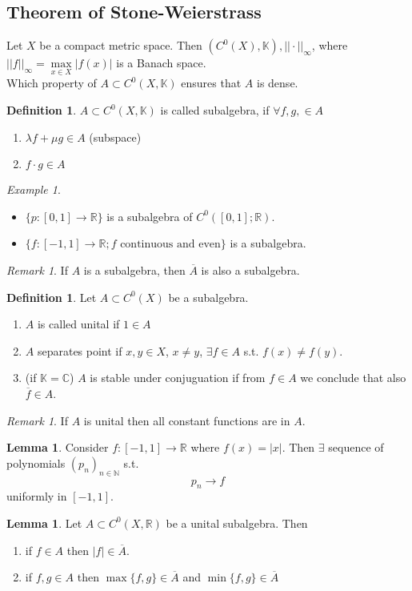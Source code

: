 \documentclass[a4paper, 12pt]{article}
\theoremstyle{plain}
\theoremstyle{definition}
\newtheorem{definition}[theorem]{Definition} %
\theoremstyle{lemma}
\newtheorem{lemma}[theorem]{Lemma}
\theoremstyle{remark}
\newtheorem{remark}[theorem]{Remark}
\theoremstyle{corollary}
\theoremstyle{example}
\newtheorem{example}[theorem]{Example}
\begin{document}
	\subsection{Theorem of Stone-Weierstrass}
	Let $X$ be a compact metric space. Then $(C^0(X), \mathbb{K}), ||\cdot ||_\infty$, where $||f||_\infty = \max\limits_{x \in X} \left|f(x)\right|$ is a Banach space.\\
	Which property of $A \subset C^0(X, \mathbb{K})$ ensures that $A$ is dense.
	\begin{definition}
		$A \subset C^0(X, \mathbb{K})$ is called subalgebra, if $\forall f,g, \in A$ \begin{enumerate}
			\item $\lambda f + \mu g \in A$ (subspace)
			\item $f\cdot g \in A$
		\end{enumerate}
	\end{definition}  
	\begin{example}
		\begin{itemize}
			\item $\{p: [0,1] \to \mathbb{R}\}$ is a subalgebra of $C^0([0,1]; \mathbb{R})$. 
			\item $\{f: [-1,1] \to \mathbb{R}; f\text{ continuous and even}\}$ is a subalgebra.
		\end{itemize}
	\end{example}
	\begin{remark}
		If $A$ is a subalgebra, then $\overline{A}$ is also a subalgebra.
	\end{remark}
	\begin{definition}
		Let $A \subset C^0(X)$ be a subalgebra. \begin{enumerate}
			\item $A$ is called unital if $1 \in A$
			\item $A$ separates point if $x,y \in X$, $x \neq y$, $\exists f \in A$ s.t. $f(x) \neq f(y)$.
			\item (if $\mathbb{K} = \mathbb{C}$) $A$ is stable under conjuguation if from $f \in A$ we conclude that also $\overline{f} \in A$.
		\end{enumerate}
	\end{definition}
	\begin{remark}
		If $A$ is unital then all constant functions are in $A$.
	\end{remark}
	\begin{lemma}
		Consider $f: [-1,1] \to \mathbb{R}$ where $f(x) = \left|x\right|$. Then $\exists$ sequence of polynomials $(p_n)_{n \in \mathbb{N}}$ s.t. \[p_n \to f\] uniformly in $[-1,1]$.
	\end{lemma}
	\begin{lemma}
		Let $A \subset C^0(X, \mathbb{R})$ be a unital subalgebra. Then \begin{enumerate}
			\item if $f \in A$ then $\left|f\right| \in \overline{A}$.
			\item if $f,g \in A$ then $\max\{f,g\} \in \overline{A}$ and $\min\{f,g\} \in \overline{A}$
		\end{enumerate}
	\end{lemma}
\end{document}
